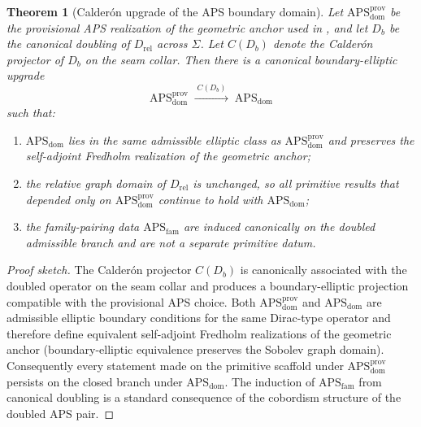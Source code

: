 \documentclass[11pt,a4paper]{article}
\newtheorem{theorem}{Theorem}[section]
\theoremstyle{definition}
\theoremstyle{remark}
\newcommand{\Seam}{\Sigma}
\newcommand{\APSdom}{\mathrm{APS}_{\mathrm{dom}}}
\newcommand{\APSfam}{\mathrm{APS}_{\mathrm{fam}}}
\newcommand{\APSdomprov}{\mathrm{APS}_{\mathrm{dom}}^{\mathrm{prov}}}
\begin{document}
\begin{theorem}[Calder\'on upgrade of the APS boundary domain]
\label{thm:apsdom-upgrade}
Let $\APSdomprov$ be the provisional APS realization of the geometric anchor used in
, and let $D_b$ be the canonical doubling of
$D_{\mathrm{rel}}$ across $\Seam$. Let $C(D_b)$ denote the Calder\'on projector of $D_b$ on the
seam collar. Then there is a canonical boundary-elliptic upgrade
\[
\APSdomprov
\;\xrightarrow{\;C(D_b)\;}\;
\APSdom
\]
such that:
\begin{enumerate}[label=(\roman*), leftmargin=1.5em, topsep=3pt, itemsep=2pt]
    \item $\APSdom$ lies in the same admissible elliptic class as $\APSdomprov$ and preserves the
    self-adjoint Fredholm realization of the geometric anchor;
    \item the relative graph domain of $D_{\mathrm{rel}}$ is unchanged, so all primitive results
    that depended only on $\APSdomprov$ continue to hold with $\APSdom$;
    \item the family-pairing data $\APSfam$ are induced canonically on the doubled admissible
    branch and are not a separate primitive datum.
\end{enumerate}
\end{theorem}

\begin{proof}[Proof sketch]
The Calder\'on projector $C(D_b)$ is canonically associated with the doubled operator on the
seam collar and produces a boundary-elliptic projection compatible with the provisional APS
choice. Both $\APSdomprov$ and $\APSdom$ are admissible elliptic boundary conditions for the
same Dirac-type operator and therefore define equivalent self-adjoint Fredholm realizations of
the geometric anchor (boundary-elliptic equivalence preserves the Sobolev graph domain).
Consequently every statement made on the primitive scaffold under $\APSdomprov$ persists on the
closed branch under $\APSdom$. The induction of $\APSfam$ from canonical doubling is a standard
consequence of the cobordism structure of the doubled APS pair.
\end{proof}
\end{document}
